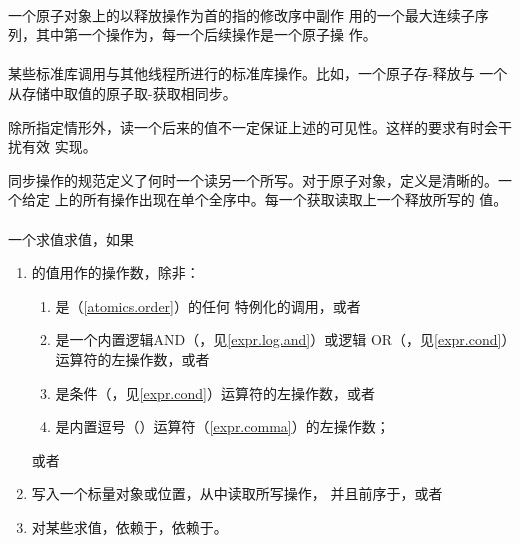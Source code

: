 \paragraph{} %
一个原子对象上的以释放操作为首的指的修改序中副作
用的一个最大连续子序列，其中第一个操作为，每一个后续操作是一个原子\rmw{}操
作。

\paragraph{} %
某些标准库调用与其他线程所进行的标准库操作。比如，一个原子存-释放与
一个从存储中取值的原子取-获取相同步。

\begin{note}
  除所指定情形外，读一个后来的值不一定保证上述的可见性。这样的要求有时会干扰有效
  实现。
\end{note}

\begin{note}
  同步操作的规范定义了何时一个读另一个所写。对于原子对象，定义是清晰的。一个给定
  \mtx{}上的所有操作出现在单个全序中。每一个\mtx{}获取读取上一个\mtx{}释放所写的
  值。
\end{note}

\paragraph{} %
一个求值求值，如果
\begin{enumerate}
  \item {}的值用作的操作数，除非：
        \begin{enumerate}
          \item {}是（\ref{atomics.order}）的任何
                特例化的调用，或者
          \item {}是一个内置逻辑AND（\tm{\&\&}，见\ref{expr.log.and}）或逻辑
                OR（\tm{||}，见\ref{expr.cond}）运算符的左操作数，或者
          \item {}是条件（，见\ref{expr.cond}）运算符的左操作数，或者
          \item {}是内置逗号（\tm{,}）运算符（\ref{expr.comma}）的左操作数；
        \end{enumerate}
        或者
  \item {}写入一个标量对象或位置，从中读取所写操作，
        并且前序于，或者
  \item 对某些求值，依赖于，依赖于。
\end{enumerate}

